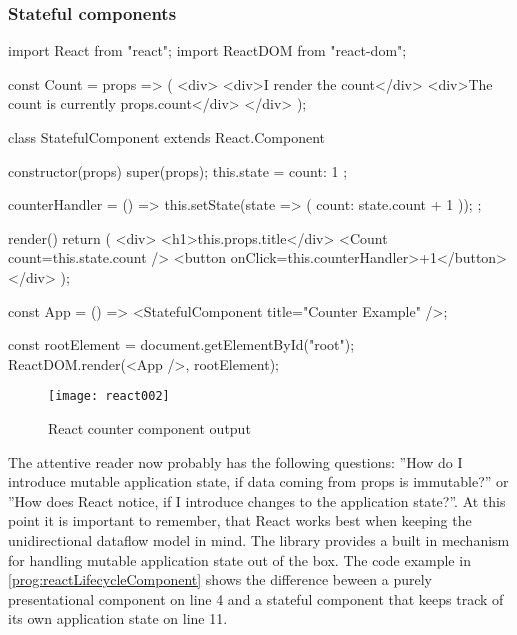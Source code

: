 \subsubsection{Stateful components}

\begin{program}
\caption{Simple example of a React component and its usage} 
\label{prog:reactStateful}
\begin{JsCode}
import React from "react";
import ReactDOM from "react-dom";

const Count = props => (
  <div>
    <div>I render the count</div>
    <div>The count is currently {props.count}</div>
  </div>
);

class StatefulComponent extends React.Component {
  constructor(props) {
    super(props);
    this.state = {
      count: 1
    };
  }

  counterHandler = () => {
    this.setState(state => ({ count: state.count + 1 }));
  };

  render() {
    return (
      <div>
        <h1>{this.props.title}</div>
        <Count count={this.state.count} />
        <button onClick={this.counterHandler}>+1</button>
      </div>
    );
  }
}

const App = () => <StatefulComponent title={"Counter Example"} />;

const rootElement = document.getElementById("root");
ReactDOM.render(<App />, rootElement);
\end{JsCode}
\end{program}

\begin{figure}
  \centering
  \texttt{[image: react002]}
  \caption{React counter component output}
  \label{fig:reactCounterComponent}
\end{figure}

The attentive reader now probably has the following questions: ''How do I introduce mutable application state, if data coming from props is immutable?'' or ''How does React notice, if I introduce changes to the application state?''. At this point it is important to remember, that React works best when keeping the unidirectional dataflow model in mind. The library provides a built in mechanism for handling mutable application state out of the box. The code example in \ref{prog:reactLifecycleComponent} shows the difference beween a purely presentational component on line 4 and a stateful component that keeps track of its own application state on line 11.

